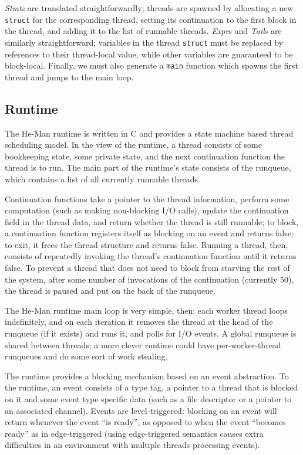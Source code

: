 \documentclass[preprint]{sigplanconf}
\renewcommand{\t}{\texttt}
\renewcommand{\i}{\textit}
\begin{document}
\i{Stmt}s are translated straightforwardly; threads are spawned by allocating a
new \t{struct} for the corresponding thread, setting its continuation to the
first block in the thread, and adding it to the list of runnable threads.
\i{Expr}s and \i{Tail}s are similarly straightforward; variables in the thread
\t{struct} must be replaced by references to their thread-local value, while
other variables are guaranteed to be block-local. Finally, we must also generate
a \t{main} function which spawns the first thread and jumps to the main loop.
  
\subsection{Runtime}

The He-Man runtime is written in C and provides a state machine based
thread scheduling model. In the view of the runtime, a thread consists
of some bookkeeping state, some private state, and the next
continuation function the thread is to run. The main part of the
runtime's state consists of the runqueue, which contains a list of all
currently runnable threads.

Continuation functions take a pointer to the thread information,
perform some computation (such as making non-blocking I/O calls),
update the continuation field in the thread data, and return whether
the thread is still runnable; to block, a continuation function
registers itself as blocking on an event and returns false; to exit,
it frees the thread structure and returns false.  Running a thread,
then, consists of repeatedly invoking the thread's continuation
function until it returns false. To prevent a thread that does not
need to block from starving the rest of the system, after some number
of invocations of the continuation (currently 50), the thread is
paused and put on the back of the runqueue.

The He-Man runtime main loop is very simple, then: each worker thread
loops indefinitely, and on each iteration it removes the thread at the
head of the runqueue (if it exists) and runs it, and polls for I/O
events. A global runqueue is shared between threads; a more clever
runtime could have per-worker-thread runqueues and do some sort of
work stealing.

The runtime provides a blocking mechanism based on an event
abstraction. To the runtime, an event consists of a type tag, a
pointer to a thread that is blocked on it and some event type specific
data (such as a file descriptor or a pointer to an associated
channel). Events are level-triggered: blocking on an event will return
whenever the event ``is ready'', as opposed to when the event
``becomes ready'' as in edge-triggered (using edge-triggered semantics
causes extra difficulties in an environment with multiple threads
processing events).
\end{document}
